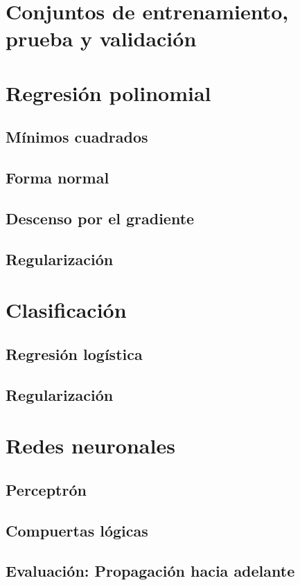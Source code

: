 \documentclass[12pt,openany]{book}
\begin{document}
\section{Conjuntos de entrenamiento, prueba y validación}

\section{Regresión polinomial}
\subsection{Mínimos cuadrados}
\subsection{Forma normal}
\subsection{Descenso por el gradiente}
\subsection{Regularización}

\section{Clasificación}
\subsection{Regresión logística}
\subsection{Regularización}

\section{Redes neuronales}
\subsection{Perceptrón}
\subsection{Compuertas lógicas}
\subsection{Evaluación: Propagación hacia adelante}
\end{document}
